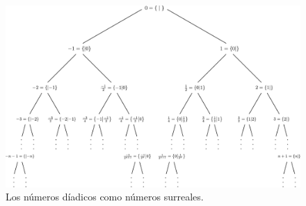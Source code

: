     \begin{figure}
        \centering
        \includegraphics[width=\textwidth]{images/surreal-finite.pdf}
        \caption{Los n\'umeros d\'iadicos como n\'umeros surreales.}
        \label{figure:surreal-finite}
    \end{figure}